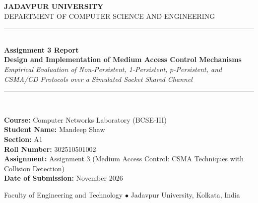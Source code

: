 \documentclass[11pt,a4paper]{article}
\begin{document}
\hypersetup{pageanchor=false}
\begin{titlepage}
    \centering
    \vspace*{1.2cm}
    
    {\Large \textbf{JADAVPUR UNIVERSITY}}\\[0.3cm]
    {\large DEPARTMENT OF COMPUTER SCIENCE AND ENGINEERING}\\[1.8cm]
    
    \rule{\linewidth}{1.2pt}\\[0.4cm]
    {\huge \textbf{Assignment 3 Report}}\\[0.3cm]
    {\LARGE \textbf{Design and Implementation of Medium Access Control Mechanisms}}\\[0.3cm]
    {\large \textit{Empirical Evaluation of Non-Persistent, 1-Persistent, $p$-Persistent, and CSMA/CD Protocols over a Simulated Socket Shared Channel}}\\[0.3cm]
    \rule{\linewidth}{1.2pt}\\[1.8cm]
    
    \begin{minipage}[t]{0.88\textwidth}
        \large
        \textbf{Course:} Computer Networks Laboratory (BCSE-III)\\[0.25cm]
        \textbf{Student Name:} Mandeep Shaw\\[0.25cm]
        \textbf{Section:} A1\\[0.25cm]
        \textbf{Roll Number:} 302510501002\\[0.25cm]
        \textbf{Assignment:} Assignment 3 (Medium Access Control: CSMA Techniques with Collision Detection)\\[0.25cm]
        \textbf{Date of Submission:} November 2026
    \end{minipage}
    
    \vfill
    {\small Faculty of Engineering and Technology $\bullet$ Jadavpur University, Kolkata, India}
    \vspace*{0.8cm}
\end{titlepage}

\hypersetup{pageanchor=true}
\tableofcontents
\newpage
{}
\setcounter{page}{1}
\end{document}
